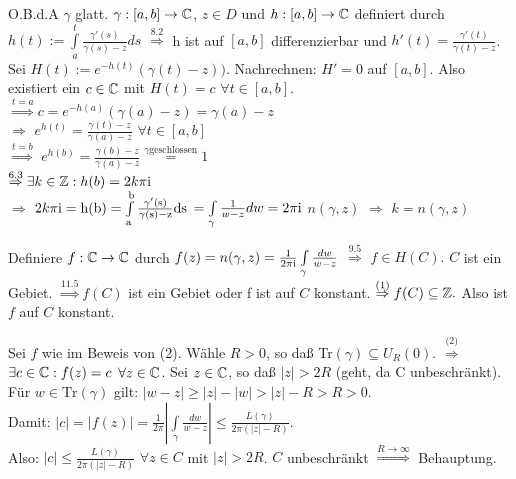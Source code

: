 \documentclass[a4paper,twoside,DIV15,BCOR12mm]{scrbook}
\def\ie{\rm i}
\begin{document}
\begin{beweis}
\begin{liste}
\item O.B.d.A $\gamma$ glatt. $ \gamma : [a,b] \to \mathbb{C}$, $z \in D$ und $h:[a,b]
\to \mathbb{C}$ definiert durch $h(t) := \int\limits_{a}^{t}
\frac{\gamma'(s)}{\gamma(s)-z} ds$  
$\stackrel{\text{8.2}}{\Rightarrow}$ h ist auf $[a,b]$ differenzierbar und $h'(t) =
\frac{\gamma'(t)}{\gamma(t)-z}$.  \\ Sei $H(t) := e^{-h(t)}(\gamma(t)-z)).$
Nachrechnen: $H' = 0$ auf $[a,b]$. Also existiert ein $c \in \mathbb{C}$ mit $H(t) = c$
$\forall t \in [a,b]$. \\ $\stackrel{t = a}{\Rightarrow}c = 
e^{-h(a)}(\gamma(a)-z) = \gamma(a) -z$ \\
$\Rightarrow $ $e^{h(t)} = \frac{\gamma(t)-z}{\gamma(a)-z}$ $\forall t \in
[a,b]$ \\
$\stackrel{t = b}{\Rightarrow}$ $e^{h(b)} = \frac{\gamma(b)-z}{\gamma(a)-z}
\stackrel{\gamma \text{geschlossen}}{=} 1$
\\ $\stackrel{\text{6.3}}{\Rightarrow} \exists k \in \MdZ: h(b) = 2k \pi \ie$ \\
$\Rightarrow$ $2k \pi \ie = h(b) = \int\limits_{a}^{b}
\frac{\gamma'(s)}{\gamma(s)-z} ds$ $= \int\limits_{\gamma}
\frac{1}{w-z} dw = 2 \pi \ie $ $n(\gamma,z)$ $\Rightarrow$ $ k = n(\gamma, z)$
\item Definiere $f: \mathbb{C} \to \mathbb{C}$ durch $f(z) = n(\gamma, z) = \frac{1}{2 \pi \ie
} \int\limits_{\gamma}\frac{dw}{w-z}$ $\stackrel{9.5}{\Rightarrow}$ $f \in H(C).
$ $C$ ist ein Gebiet. $\stackrel{\text{11.5}}{\Rightarrow} f(C)$ ist ein Gebiet oder f
ist auf $C$ konstant. $\stackrel{\text{(1)}}{\Rightarrow} f(C) \subseteq \mathbb{Z}.$
Also ist $f$ auf $C$ konstant. 
\item Sei $f$ wie im Beweis von (2). Wähle $R > 0$, so daß Tr$(\gamma) \subseteq
U_R(0).$ $\stackrel{\text{(2)}}{\Rightarrow}$ $\exists c \in \mathbb{C}: f(z) = c$
$\forall z \in \mathbb{C}$. Sei $z \in \mathbb{C}$, so daß $|z| > 2R$ (geht, da C
unbeschränkt). \\
Für $w \in \text{Tr}(\gamma)$ gilt: $|w-z| \geq |z|-|w| > |z| -R > R > 0$. \\
Damit: $|c| = |f(z)| = \frac{1}{2 \pi} |\int\limits_{\gamma} \frac{dw}{w-z}|
\leq \frac{L(\gamma)}{2 \pi (|z| -R)}$. \\
Also: $|c| \leq \frac{L(\gamma)}{2 \pi (|z| -R)}$ $\forall z \in C$ mit $|z| >
2R$. $C$ unbeschränkt $\stackrel{R \to \infty}{\Rightarrow}$  Behauptung.
\end{liste}
\end{beweis}
\end{document}
